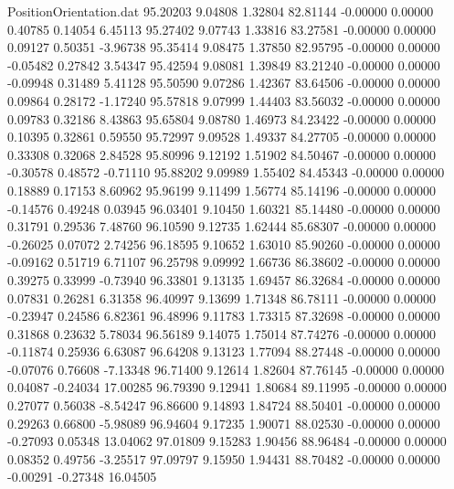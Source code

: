 \begin{filecontents}{PositionOrientation.dat}
  95.20203    9.04808    1.32804    82.81144   -0.00000    0.00000    0.40785    0.14054    6.45113
  95.27402    9.07743    1.33816    83.27581   -0.00000    0.00000    0.09127    0.50351   -3.96738
  95.35414    9.08475    1.37850    82.95795   -0.00000    0.00000   -0.05482    0.27842    3.54347
  95.42594    9.08081    1.39849    83.21240   -0.00000    0.00000   -0.09948    0.31489    5.41128
  95.50590    9.07286    1.42367    83.64506   -0.00000    0.00000    0.09864    0.28172   -1.17240
  95.57818    9.07999    1.44403    83.56032   -0.00000    0.00000    0.09783    0.32186    8.43863
  95.65804    9.08780    1.46973    84.23422   -0.00000    0.00000    0.10395    0.32861    0.59550
  95.72997    9.09528    1.49337    84.27705   -0.00000    0.00000    0.33308    0.32068    2.84528
  95.80996    9.12192    1.51902    84.50467   -0.00000    0.00000   -0.30578    0.48572   -0.71110
  95.88202    9.09989    1.55402    84.45343   -0.00000    0.00000    0.18889    0.17153    8.60962
  95.96199    9.11499    1.56774    85.14196   -0.00000    0.00000   -0.14576    0.49248    0.03945
  96.03401    9.10450    1.60321    85.14480   -0.00000    0.00000    0.31791    0.29536    7.48760
  96.10590    9.12735    1.62444    85.68307   -0.00000    0.00000   -0.26025    0.07072    2.74256
  96.18595    9.10652    1.63010    85.90260   -0.00000    0.00000   -0.09162    0.51719    6.71107
  96.25798    9.09992    1.66736    86.38602   -0.00000    0.00000    0.39275    0.33999   -0.73940
  96.33801    9.13135    1.69457    86.32684   -0.00000    0.00000    0.07831    0.26281    6.31358
  96.40997    9.13699    1.71348    86.78111   -0.00000    0.00000   -0.23947    0.24586    6.82361
  96.48996    9.11783    1.73315    87.32698   -0.00000    0.00000    0.31868    0.23632    5.78034
  96.56189    9.14075    1.75014    87.74276   -0.00000    0.00000   -0.11874    0.25936    6.63087
  96.64208    9.13123    1.77094    88.27448   -0.00000    0.00000   -0.07076    0.76608   -7.13348
  96.71400    9.12614    1.82604    87.76145   -0.00000    0.00000    0.04087   -0.24034   17.00285
  96.79390    9.12941    1.80684    89.11995   -0.00000    0.00000    0.27077    0.56038   -8.54247
  96.86600    9.14893    1.84724    88.50401   -0.00000    0.00000    0.29263    0.66800   -5.98089
  96.94604    9.17235    1.90071    88.02530   -0.00000    0.00000   -0.27093    0.05348   13.04062
  97.01809    9.15283    1.90456    88.96484   -0.00000    0.00000    0.08352    0.49756   -3.25517
  97.09797    9.15950    1.94431    88.70482   -0.00000    0.00000   -0.00291   -0.27348   16.04505

\end{filecontents}
